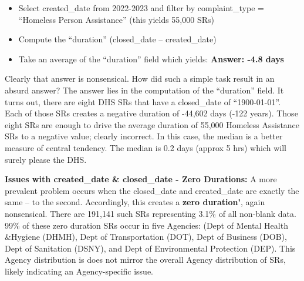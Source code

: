 \documentclass[linenumber]{jdsart}
\begin{document}
		
\begin{itemize}
    \item Select created\_date from 2022-2023 and filter by complaint\_type = 
    ``Homeless Person Assistance'' (this yields 55,000 SRs)
    
    \item Compute the ``duration'' (closed\_date – created\_date)
    
    \item Take an average of the ``duration'' field  which yields: \textbf{Answer:  -4.8 days}  
\end{itemize}

		
Clearly that answer is nonsensical. How did such a simple task result 
in an absurd answer? The answer lies in the computation of the ``duration'' 
field. It turns out, there are eight DHS SRs that have a closed\_date 
of ``1900-01-01''. Each of those SRs creates a negative duration of -44,602 
days (-122 years). Those eight SRs are enough to drive the 
average duration of 55,000 Homeless Assistance SRs to a negative 
value; clearly incorrect. In this case, the median is a better measure 
of central tendency. The median is  0.2 days (approx 5 hrs) which will
surely please the DHS. 

		
	
		
\label{sec: zeroduration}		
\textbf{Issues with created\_date \& closed\_date - Zero Durations:} A more 
prevalent problem occurs when the closed\_date and created\_date 
are exactly the same -- to the second. Accordingly, this creates 
a \textbf{zero duration'}, again nonsensical. There are 191,141 
such SRs representing 3.1\% of all non-blank data. 99\% of these zero duration 
SRs occur in five Agencies:  (Dept of Mental Health \&Hygiene (DHMH), Dept 
of Transportation (DOT), Dept of Business (DOB), Dept of Sanitation 
(DSNY), and Dept of Environmental Protection (DEP). This Agency distribution
is does not mirror the overall Agency distribution of SRs, likely indicating an 
Agency-specific issue.
	
		
\end{document}
